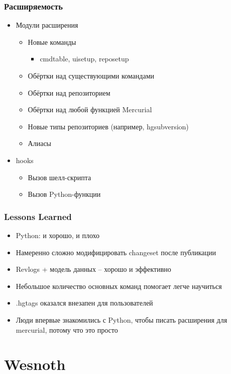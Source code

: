 \documentclass{../../slides-style}
\begin{document}
	\begin{frame}
		\frametitle{Расширяемость}
		\begin{itemize}
			\item Модули расширения
			\begin{itemize}
				\item Новые команды
				\begin{itemize}
					\item cmdtable, uisetup, reposetup
				\end{itemize}
				\item Обёртки над существующими командами
				\item Обёртки над репозиторием
				\item Обёртки над любой функцией Mercurial
				\item Новые типы репозиториев (например, hgsubversion)
				\item Алиасы
			\end{itemize}
			\item hooks
			\begin{itemize}
				\item Вызов шелл-скрипта
				\item Вызов Python-функции
			\end{itemize}
		\end{itemize}
	\end{frame}

	\begin{frame}
		\frametitle{Lessons Learned}
		\begin{itemize}
			\item Python: и хорошо, и плохо
			\item Намеренно сложно модифицировать changeset после публикации
			\item Revlogs + модель данных -- хорошо и эффективно
			\item Небольшое количество основных команд помогает легче научиться
			\item .hgtags оказался внезапен для пользователей
			\item Люди впервые знакомились с Python, чтобы писать расширения для mercurial, потому что это просто
		\end{itemize}
	\end{frame}

	\section{Wesnoth}
\end{document}
